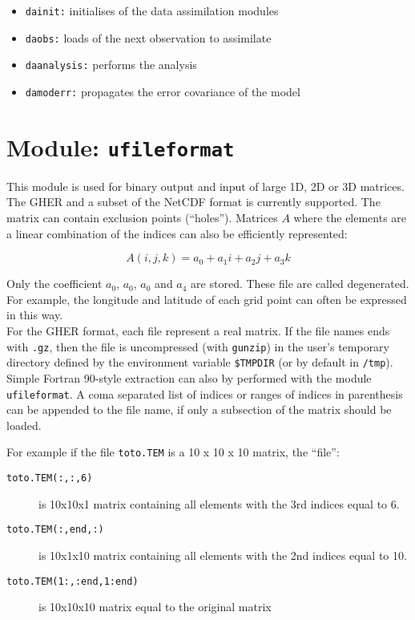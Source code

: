 \documentclass[a4paper,12pt]{article}
\newcommand{\code}{\texttt}
\begin{document}
\begin{itemize}
\item \code{dainit:} initialises of the data assimilation modules
\item \code{daobs:} loads of the next observation to assimilate
\item \code{daanalysis:} performs the analysis
\item \code{damoderr:} propagates the error covariance of the model 
\end{itemize}

\section{Module: \code{ufileformat}}\label{subsec_use_ufileformat}

This module is used for binary output and input of large 1D, 2D or 3D
matrices. The GHER and a subset of the NetCDF format is currently
supported. The matrix can contain exclusion points
(``holes''). Matrices $A$ where the elements are a linear combination of
the indices can also be efficiently represented: 

\begin{equation}
A(i,j,k) = a_0 + a_1 i + a_2 j + a_3 k
\end{equation}

Only the coefficient $a_0$, $a_0$, $a_0$ and $a_4$ are
stored. These file are called degenerated. For example, the longitude and latitude of each grid point can
often be expressed in this way.\\

For the GHER format, each file represent a real matrix. If the
file names ends with \code{.gz}, then the file is uncompressed
(with \code{gunzip}) in the user's temporary directory defined by the
environment variable \code{\$TMPDIR} (or by default in
\code{/tmp}). Simple Fortran 90-style extraction can also by performed
with the module \code{ufileformat}. A coma separated
list of indices or ranges of indices in parenthesis can be appended to
the file name, if only a subsection of the matrix should be loaded.

For example if the file
\code{toto.TEM} is a 10 x 10 x 10 matrix, the ``file'':

\begin{description}
\item[\code{toto.TEM(:,:,6)}] is 10x10x1 matrix containing all
  elements with the 3rd indices equal to 6.
\item[\code{toto.TEM(:,end,:)}] is 10x1x10 matrix containing all
  elements with the 2nd indices equal to 10.
\item[\code{toto.TEM(1:,:end,1:end)}] is 10x10x10 matrix equal to the
  original matrix
\end{description}
\end{document}
